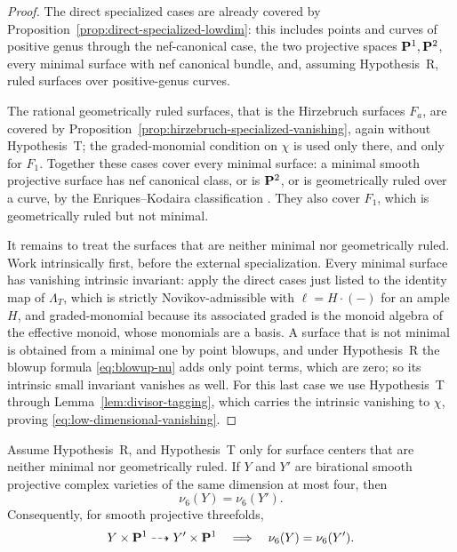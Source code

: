 \begin{proof}
The direct specialized cases are already covered by
Proposition~\ref{prop:direct-specialized-lowdim}: this includes points and
curves of positive genus through the nef-canonical case, the two projective
spaces \(\mathbf P^1,\mathbf P^2\), every minimal surface with nef canonical bundle,
and, assuming Hypothesis~R, ruled surfaces over positive-genus curves.

The rational geometrically ruled surfaces, that is the Hirzebruch surfaces
\(F_a\), are covered by Proposition~\ref{prop:hirzebruch-specialized-vanishing},
again without Hypothesis~T; the graded-monomial condition on \(\chi\) is used
only there, and only for \(F_1\).  Together these cases cover every minimal
surface: a minimal smooth projective surface has nef canonical class, or is
\(\mathbf P^2\), or is geometrically ruled over a curve, by the Enriques--Kodaira
classification \cite[Chapter~VI]{BeauvilleSurfaces}.  They also cover \(F_1\),
which is geometrically ruled but not minimal.

It remains to treat the surfaces that are neither minimal nor geometrically
ruled.  Work intrinsically first, before the external specialization.  Every
minimal surface has vanishing intrinsic invariant: apply the direct cases just
listed to the identity map of \(\Lambda_T\), which is strictly
Novikov-admissible with \(\ell=H\cdot(-)\) for an ample \(H\), and
graded-monomial because its associated graded is the monoid algebra of the
effective monoid, whose monomials are a basis.  A surface that is not minimal
is obtained from a minimal one
by point blowups, and under Hypothesis~R the blowup formula
\eqref{eq:blowup-nu} adds only point terms, which are zero; so its intrinsic
small invariant vanishes as well.  For this last case we use Hypothesis~T
through Lemma~\ref{lem:divisor-tagging}, which carries the intrinsic vanishing
to \(\chi\), proving \eqref{eq:low-dimensional-vanishing}.
\end{proof}

\begin{theorem}
\label{thm:nu6-birational-invariance}
%
%
Assume Hypothesis~R, and Hypothesis~T only for surface centers that are
neither minimal nor geometrically ruled.
If \(Y\) and \(Y'\) are birational smooth projective complex varieties of
the same dimension at most four, then
\[
 \nu_6(Y)=\nu_6(Y').
 \label{eq:nu-birational-invariance}
\]
Consequently, for smooth projective threefolds,
\[
 Y\times\mathbf P^1\dashrightarrow Y'\times\mathbf P^1
 \quad\Longrightarrow\quad \nu_6(Y)=\nu_6(Y').
\]
\end{theorem}

